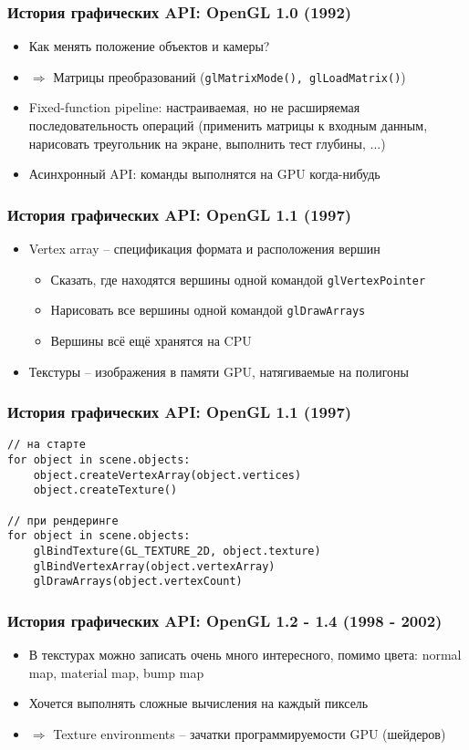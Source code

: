 \documentclass{beamer}
\begin{document}
\begin{frame}[fragile]
\frametitle{История графических API: OpenGL 1.0 (1992)}
\begin{itemize}
\item Как менять положение объектов и камеры?
\pause
\item $\Longrightarrow$ Матрицы преобразований (\verb|glMatrixMode(), glLoadMatrix()|)
\pause
\item Fixed-function pipeline: настраиваемая, но не расширяемая последовательность операций (применить матрицы к входным данным, нарисовать треугольник на экране, выполнить тест глубины, ...)
\pause
\item Асинхронный API: команды выполнятся на GPU когда-нибудь
\end{itemize}
\end{frame}

\begin{frame}[fragile]
\frametitle{История графических API: OpenGL 1.1 (1997)}
\begin{itemize}
\item Vertex array -- спецификация формата и расположения вершин
\begin{itemize}
\item Сказать, где находятся вершины одной командой \verb|glVertexPointer|
\item Нарисовать все вершины одной командой \verb|glDrawArrays|
\item Вершины всё ещё хранятся на CPU
\end{itemize}
\pause
\item Текстуры -- изображения в памяти GPU, натягиваемые на полигоны
\end{itemize}
\end{frame}

\begin{frame}[fragile]
\frametitle{История графических API: OpenGL 1.1 (1997)}
\begin{verbatim}
// на старте
for object in scene.objects:
    object.createVertexArray(object.vertices)
    object.createTexture()

// при рендеринге
for object in scene.objects:
    glBindTexture(GL_TEXTURE_2D, object.texture)
    glBindVertexArray(object.vertexArray)
    glDrawArrays(object.vertexCount)
\end{verbatim}
\end{frame}

\begin{frame}
\frametitle{История графических API: OpenGL 1.2 - 1.4 (1998 - 2002)}
\begin{itemize}
\item В текстурах можно записать очень много интересного, помимо цвета: normal map, material map, bump map
\item Хочется выполнять сложные вычисления на каждый пиксель
\pause
\item $\Longrightarrow$ Texture environments -- зачатки программируемости GPU (шейдеров)
\end{itemize}
\end{frame}
\end{document}
